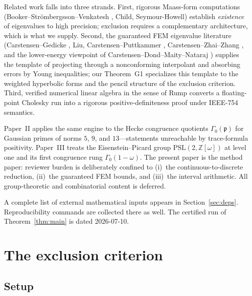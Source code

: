 \documentclass[11pt]{amsart}
\newcommand{\ZZ}{\mathbb{Z}}
\newcommand{\PSL}{\mathrm{PSL}}
\begin{document}
Related work falls into three strands.  First, rigorous Maass-form
computations (Booker--Str\"ombergsson--Venkatesh \cite{BSV06}, Child,
Seymour-Howell) establish \emph{existence} of eigenvalues to high
precision; exclusion requires a complementary architecture, which is
what we supply.  Second, the guaranteed FEM eigenvalue literature
(Carstensen--Gedicke \cite{CG14}, Liu, Carstensen--Puttkammer
\cite{CP22}, Carstensen--Zhai--Zhang \cite{CZZ20}, and the lower-energy
viewpoint of Carstensen--Dond--Maity--Nataraj \cite{CDMN26}) supplies the
template of projecting through a nonconforming interpolant and absorbing
errors by Young inequalities; our Theorem~G1 specializes this template
to the weighted hyperbolic forms and the pencil structure of the
exclusion criterion.  Third, verified numerical linear algebra in the
sense of Rump \cite{Rump06} converts a floating-point Cholesky run into
a rigorous positive-definiteness proof under IEEE-754 semantics.

Paper~II \cite{PaperII} applies the same engine to the Hecke congruence
quotients $\Gamma_0(\mathfrak{p})$ for Gaussian primes of norms $5$,
$9$, and $13$---statements unreachable by trace-formula positivity.
Paper~III \cite{PaperIII} treats the Eisenstein--Picard group
$\PSL(2,\ZZ[\omega])$ at level one and its first congruence rung
$\Gamma_0(1-\omega)$.  The present paper is the method paper: reviewer
burden is deliberately confined to (i)~the continuous-to-discrete
reduction, (ii)~the guaranteed FEM bounds, and (iii)~the interval
arithmetic.  All group-theoretic and combinatorial content is deferred.

A complete list of external mathematical inputs appears in
Section~\ref{sec:deps}.  Reproducibility commands are collected there as
well.  The certified run of Theorem~\ref{thm:main} is dated 2026-07-10.

\section{The exclusion criterion}\label{sec:criterion}

\subsection{Setup}
\end{document}
